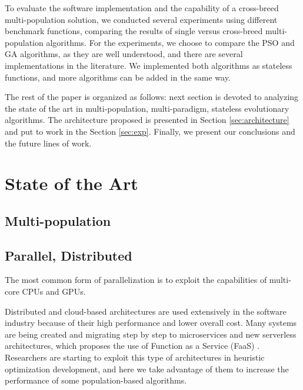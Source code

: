 \documentclass[runningheads]{llncs}
\begin{document}

To evaluate the software implementation and the capability of a 
cross-breed multi-population solution,
we conducted several experiments using different benchmark functions, comparing the
results of single versus cross-breed multi-population algorithms. For the experiments, we choose to
compare the PSO and GA algorithms, as they are well understood, and there are
several implementations in the literature. We implemented both algorithms as
stateless functions, and more algorithms can be added in the same way.



The rest of the paper is organized as follows: next section is devoted
to analyzing the state of the art in multi-population, multi-paradigm,
stateless evolutionary algorithms. The architecture proposed is
presented in Section \ref{sec:architecture} and put to work in the
Section \ref{sec:exp}. Finally, we present our conclusions and the
future lines of work.

\section{State of the Art}

\subsection{Multi-population}





\subsection{Parallel, Distributed}
The most common form of parallelization is to exploit the capabilities of multi-core CPUs and
GPUs.   




Distributed and cloud-based architectures are used extensively in the software
industry because of their high performance and lower overall cost. Many systems
are being created and migrating step by step to microservices and new serverless
architectures, which proposes the use of Function as a Service (FaaS) 
\cite{Hellerstein2018,Everywhere,Baird2016}. 
Researchers are starting to exploit this type of architectures in heuristic optimization
development, and here we take advantage of them to increase the performance of
some population-based algorithms.
\end{document}
